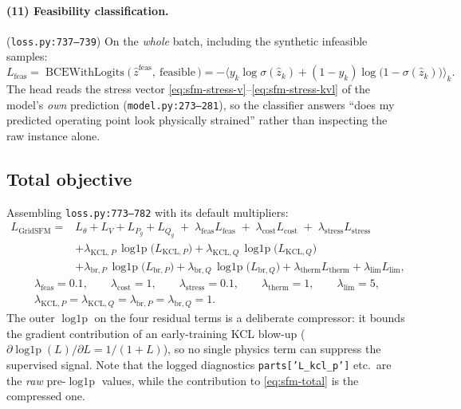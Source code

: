 \documentclass[11pt]{article}
\newcommand{\pred}[1]{\widehat{#1}}
\newcommand{\code}[1]{\texttt{\small #1}}
\newcommand{\sig}{\sigma}
\newcommand{\logp}{\operatorname{log1p}}
\begin{document}
\paragraph{(11) Feasibility classification.}
(\code{loss.py:737--739}) On the \emph{whole} batch, including the synthetic infeasible
samples:
\begin{equation}
L_{\mathrm{feas}}=\operatorname{BCEWithLogits}\!\big(\,\pred{z}^{\mathrm{feas}},\ \text{feasible}\,\big)
=-\Big\langle y_k\log\sig(\pred z_k)+(1-y_k)\log\big(1-\sig(\pred z_k)\big)\Big\rangle_k .
\label{eq:sfm-feas}
\end{equation}
The head reads the stress vector \eqref{eq:sfm-stress-v}--\eqref{eq:sfm-stress-kvl} of the
model's \emph{own} prediction (\code{model.py:273--281}), so the classifier answers ``does
my predicted operating point look physically strained'' rather than inspecting the raw
instance alone.

\subsection{Total objective}

Assembling \code{loss.py:773--782} with its default multipliers:
\begin{equation}
\boxed{
\begin{aligned}
L_{\mathrm{GridSFM}}
={}& L_\theta+L_V+L_{P_g}+L_{Q_g}
\;+\;\lambda_{\mathrm{feas}}L_{\mathrm{feas}}
\;+\;\lambda_{\mathrm{cost}}L_{\mathrm{cost}}
\;+\;\lambda_{\mathrm{stress}}L_{\mathrm{stress}}\\
&+\lambda_{\mathrm{KCL},P}\,\logp\!\big(L_{\mathrm{KCL},P}\big)
+\lambda_{\mathrm{KCL},Q}\,\logp\!\big(L_{\mathrm{KCL},Q}\big)\\
&+\lambda_{\mathrm{br},P}\,\logp\!\big(L_{\mathrm{br},P}\big)
+\lambda_{\mathrm{br},Q}\,\logp\!\big(L_{\mathrm{br},Q}\big)
+\lambda_{\mathrm{therm}}L_{\mathrm{therm}}
+\lambda_{\mathrm{lim}}L_{\mathrm{lim}} ,
\end{aligned}}
\label{eq:sfm-total}
\end{equation}
\begin{gather*}
\lambda_{\mathrm{feas}}=0.1,\qquad
\lambda_{\mathrm{cost}}=1,\qquad
\lambda_{\mathrm{stress}}=0.1,\qquad
\lambda_{\mathrm{therm}}=1,\qquad
\lambda_{\mathrm{lim}}=5,\\
\lambda_{\mathrm{KCL},P}=\lambda_{\mathrm{KCL},Q}=\lambda_{\mathrm{br},P}=\lambda_{\mathrm{br},Q}=1 .
\end{gather*}
The outer $\logp$ on the four residual terms is a deliberate compressor: it bounds the
gradient contribution of an early-training KCL blow-up ($\partial\logp(L)/\partial L
=1/(1+L)$), so no single physics term can suppress the supervised signal. Note that the
logged diagnostics \code{parts['L\_kcl\_p']} etc.\ are the \emph{raw} pre-$\logp$ values,
while the contribution to \eqref{eq:sfm-total} is the compressed one.
\end{document}
